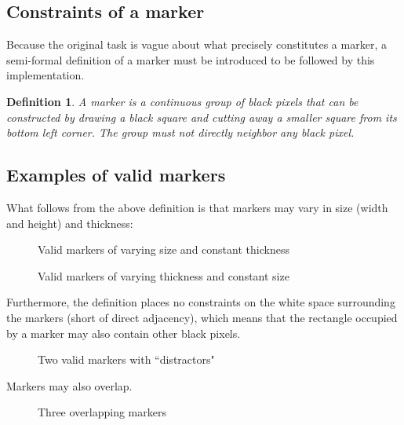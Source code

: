 \documentclass{article}
\begin{document}
	\subsection{Constraints of a marker}
	
	Because the original task is vague about what precisely constitutes a
	marker, a semi-formal definition of a marker must be introduced to be
	followed by this implementation.
	
	\newtheorem{definition}{Definition}
	\begin{definition}
		\label{def:marker}
  		A marker is a continuous group of black pixels that can be constructed
		by drawing a black square and cutting away a smaller square from its
		bottom left corner. The group must not directly neighbor any black
		pixel.
	\end{definition}
	
	\newpage
	\subsection{Examples of valid markers}
	
	What follows from the above definition is that markers may vary in size
	(width and height) and thickness:
	\begin{figure}[h]
		\centering
		\caption{Valid markers of varying size and constant thickness}
	\end{figure}
	\begin{figure}[h]
		\centering
		\caption{Valid markers of varying thickness and constant size}
	\end{figure}
	
	Furthermore, the definition places no constraints on the white space
	surrounding the markers (short of direct adjacency), which means that the
	rectangle occupied by a marker may also contain other black pixels.
	
	\begin{figure}[h]
		\centering
		\caption{Two valid markers with ``distractors"}
		\label{fig:distractors}
	\end{figure}
	
	\newpage
	Markers may also overlap.
	
	\begin{figure}[h]
		\centering
		\caption{Three overlapping markers}
	\end{figure}
	
\end{document}
